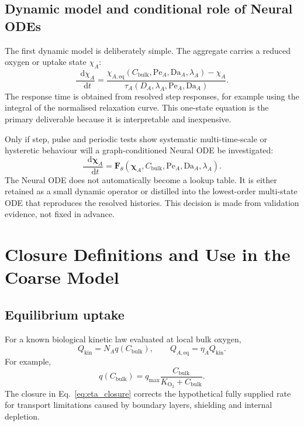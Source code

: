 \documentclass[11pt,a4paper]{article}
\newcommand{\Pe}{\mathrm{Pe}}
\newcommand{\Da}{\mathrm{Da}}
\newcommand{\Otwo}{\mathrm{O}_2}
\newcommand{\diff}{\mathop{}\!\mathrm{d}}
\begin{document}
\subsection{Dynamic model and conditional role of Neural ODEs}

The first dynamic model is deliberately simple. The aggregate carries a
reduced oxygen or uptake state \(\chi_A\):
\begin{equation}
  \frac{\diff\chi_A}{\diff t}
  =\frac{\chi_{A,\mathrm{eq}}
  (C_{\mathrm{bulk}},\Pe_A,\Da_A,\lambda_A)-\chi_A}
  {\tau_A(D_A,\lambda_A,\Pe_A,\Da_A)}.
  \label{eq:relaxation}
\end{equation}
The response time is obtained from resolved step responses, for example using
the integral of the normalised relaxation curve. This one-state equation is
the primary deliverable because it is interpretable and inexpensive.

Only if step, pulse and periodic tests show systematic multi-time-scale or
hysteretic behaviour will a graph-conditioned Neural ODE be investigated:
\begin{equation}
  \frac{\diff\boldsymbol{\chi}_A}{\diff t}
  =\boldsymbol{F}_{\theta}
  (\boldsymbol{\chi}_A,C_{\mathrm{bulk}},\Pe_A,\Da_A,\lambda_A).
  \label{eq:node}
\end{equation}
The Neural ODE does not automatically become a lookup table. It is either
retained as a small dynamic operator or distilled into the lowest-order
multi-state ODE that reproduces the resolved histories. This decision is made
from validation evidence, not fixed in advance.

\section{Closure Definitions and Use in the Coarse Model}

\subsection{Equilibrium uptake}

For a known biological kinetic law evaluated at local bulk oxygen,
\begin{equation}
  Q_{\mathrm{kin}}
  =N_A q(C_{\mathrm{bulk}}),
  \qquad
  Q_{A,\mathrm{eq}}=\eta_A Q_{\mathrm{kin}}.
  \label{eq:uptake}
\end{equation}
For example,
\begin{equation}
  q(C_{\mathrm{bulk}})
  =q_{\max}\frac{C_{\mathrm{bulk}}}
  {K_{\Otwo}+C_{\mathrm{bulk}}}.
\end{equation}
The closure in Eq.~\eqref{eq:eta_closure} corrects the hypothetical
fully supplied rate for transport limitations caused by boundary layers,
shielding and internal depletion.
\end{document}
